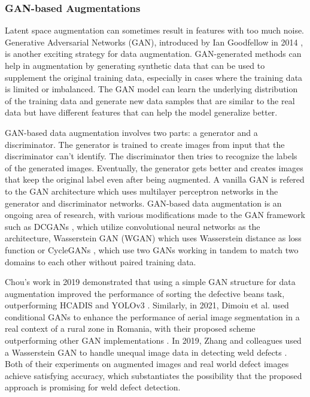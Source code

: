 \subsubsection{GAN-based Augmentations }
Latent space augmentation can sometimes result in features with too much noise. Generative Adversarial Networks (GAN), introduced by Ian Goodfellow in 2014 \cite{goodfellow2020generative}, is another exciting strategy for data augmentation. GAN-generated methods can help in augmentation by generating synthetic data that can be used to supplement the original training data, especially in cases where the training data is limited or imbalanced. The GAN model can learn the underlying distribution of the training data and generate new data samples that are similar to the real data but have different features that can help the model generalize better.

GAN-based data augmentation involves two parts: a generator and a discriminator. The generator is trained to create images from input that the discriminator can't identify. The discriminator then tries to recognize the labels of the generated images. Eventually, the generator gets better and creates images that keep the original label even after being augmented. A vanilla GAN is refered to the GAN architecture which uses multilayer perceptron networks in the generator and discriminator networks. GAN-based data augmentation is an ongoing area of research, with various modifications made to the GAN framework such as DCGANs \cite{radford2015unsupervised}, which utilize convolutional neural networks as the architecture, Wasserstein GAN (WGAN) \cite{arjovsky2017wasserstein} which uses Wasserstein distance as loss function or CycleGANs \cite{zhu2017unpaired}, which use two GANs working in tandem to match two domains to each other without paired training data.

Chou's work in 2019 demonstrated that using a simple GAN structure for data augmentation improved the performance of sorting the defective beans task, outperforming HCADIS and YOLOv3 \cite{chou2019deep}. Similarly, in 2021, Dimoiu et al. used conditional GANs to enhance the performance of aerial image segmentation in a real context of a rural zone in Romania, with their proposed scheme outperforming other GAN implementations \cite{dimoiu2021improved}. In 2019, Zhang and colleagues used a Wasserstein GAN to handle unequal image data in detecting weld defects \cite{zhang2019weld}. Both of their experiments on augmented images and real world defect images achieve satisfying accuracy, which substantiates the possibility that the proposed approach is promising for weld defect detection. 

